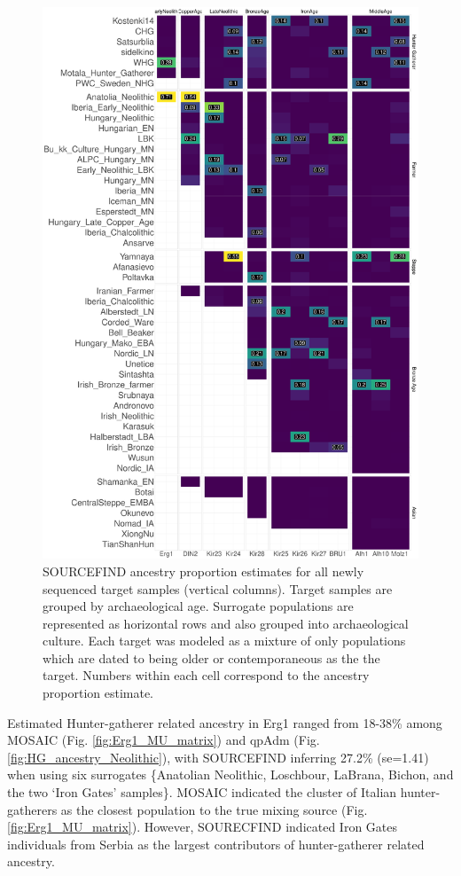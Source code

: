 \begin{figure}[htp]
    \centering
    \includegraphics[width=1.0\textwidth]{../images/chapter4/SOURCEFINDheatmapOlderSurrogates_2.pdf}
    \caption{SOURCEFIND ancestry proportion estimates for all newly sequenced target samples (vertical columns). Target samples are grouped by archaeological age. Surrogate populations are represented as horizontal rows and also grouped into archaeological culture. Each target was modeled as a mixture of only populations which are dated to being older or contemporaneous as the the target. Numbers within each cell correspond to the ancestry proportion estimate.}
    \label{fig:chapter4resultsSFheatmapolder}
\end{figure}


Estimated Hunter-gatherer related ancestry in Erg1 ranged from 18-38\% among MOSAIC (Fig. \ref{fig:Erg1_MU_matrix}) and qpAdm (Fig. \ref{fig:HG_ancestry_Neolithic}), with SOURCEFIND inferring 27.2\% (se=1.41) when using six surrogates \{Anatolian Neolithic, Loschbour, LaBrana, Bichon, and the two `Iron Gates' samples\}. MOSAIC indicated the cluster of Italian hunter-gatherers as the closest population to the true mixing source (Fig. \ref{fig:Erg1_MU_matrix}). However, SOURECFIND indicated Iron Gates individuals from Serbia as the largest contributors of hunter-gatherer related ancestry.


